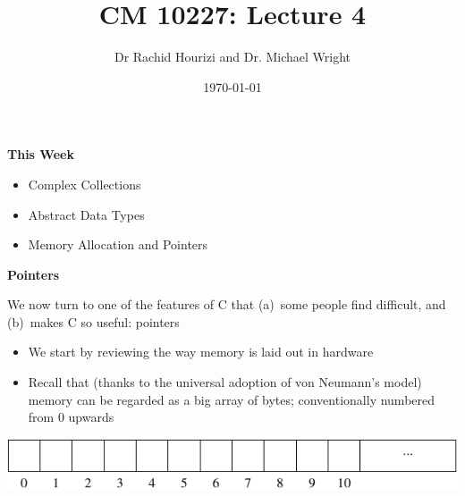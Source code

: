 \documentclass{beamer}
\begin{document}

\title{CM 10227: Lecture 4}
\author{Dr Rachid Hourizi and Dr. Michael Wright}
\date{\today}
\frame{\titlepage}

\begin{frame}
\begin{center}
\textbf{This Week}
\end{center}
\begin{itemize}
\item Complex Collections
\item Abstract Data Types
\bigskip
\item Memory Allocation and Pointers
\end{itemize}
\end{frame}

\begin{frame}
\begin{center}
\textbf{Pointers}
\end{center}
We now turn to one of the features of C that (a)~some people find difficult, and
(b)~makes C so useful: pointers
\begin{itemize}
\item{We start by reviewing the way memory is laid out in hardware}
\item{Recall that (thanks to the universal adoption of von Neumann's
  model) memory can be regarded as a big array of bytes; conventionally
  numbered from 0 upwards}
\end{itemize}
\bigskip
\begin{center}
\includegraphics[keepaspectratio]{Pics/bytes}
\end{center}
\end{frame}
\end{document}
